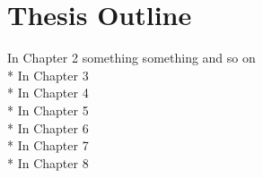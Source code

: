 \section{Thesis Outline}
In Chapter 2 something something and so on
\\*
In Chapter 3
\\*
In Chapter 4
\\*
In Chapter 5
\\*
In Chapter 6
\\*
In Chapter 7
\\*
In Chapter 8
%
%
%
%
%
%
%
%
%
%
%
%

